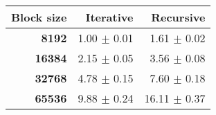 \begin{tabular}{rrr}\toprule
\textbf{Block size}  & \textbf{Iterative} & \textbf{Recursive}\\\midrule
\textbf{8192}  & 1.00 $\pm$ 0.01 & 1.61 $\pm$ 0.02\\
\textbf{16384}  & 2.15 $\pm$ 0.05 & 3.56 $\pm$ 0.08\\
\textbf{32768}  & 4.78 $\pm$ 0.15 & 7.60 $\pm$ 0.18\\
\textbf{65536} & 9.88 $\pm$ 0.24 & 16.11 $\pm$ 0.37\\
\bottomrule
\end{tabular}
